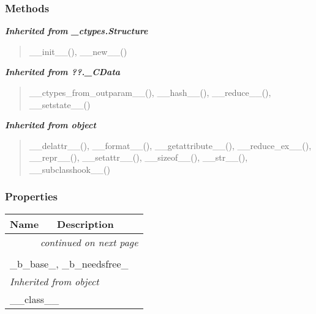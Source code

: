 
  \subsubsection{Methods}


\large{\textbf{\textit{Inherited from \_ctypes.Structure}}}

\begin{quote}
\_\_init\_\_(), \_\_new\_\_()
\end{quote}

\large{\textbf{\textit{Inherited from ??.\_CData}}}

\begin{quote}
\_\_ctypes\_from\_outparam\_\_(), \_\_hash\_\_(), \_\_reduce\_\_(), \_\_setstate\_\_()
\end{quote}

\large{\textbf{\textit{Inherited from object}}}

\begin{quote}
\_\_delattr\_\_(), \_\_format\_\_(), \_\_getattribute\_\_(), \_\_reduce\_ex\_\_(), \_\_repr\_\_(), \_\_setattr\_\_(), \_\_sizeof\_\_(), \_\_str\_\_(), \_\_subclasshook\_\_()
\end{quote}


  \subsubsection{Properties}

    \vspace{-1cm}
\hspace{\varindent}\begin{longtable}{|p{\varnamewidth}|p{\vardescrwidth}|l}
\cline{1-2}
\cline{1-2} \centering \textbf{Name} & \centering \textbf{Description}& \\
\cline{1-2}
\endhead\cline{1-2}\multicolumn{3}{r}{\small\textit{continued on next page}}\\\endfoot\cline{1-2}
\endlastfoot\multicolumn{2}{|l|}{\textit{Inherited from ??.\_CData}}\\
\multicolumn{2}{|p{\varwidth}|}{\raggedright \_b\_base\_, \_b\_needsfree\_}\\
\cline{1-2}
\multicolumn{2}{|l|}{\textit{Inherited from object}}\\
\multicolumn{2}{|p{\varwidth}|}{\raggedright \_\_class\_\_}\\
\cline{1-2}
\end{longtable}

